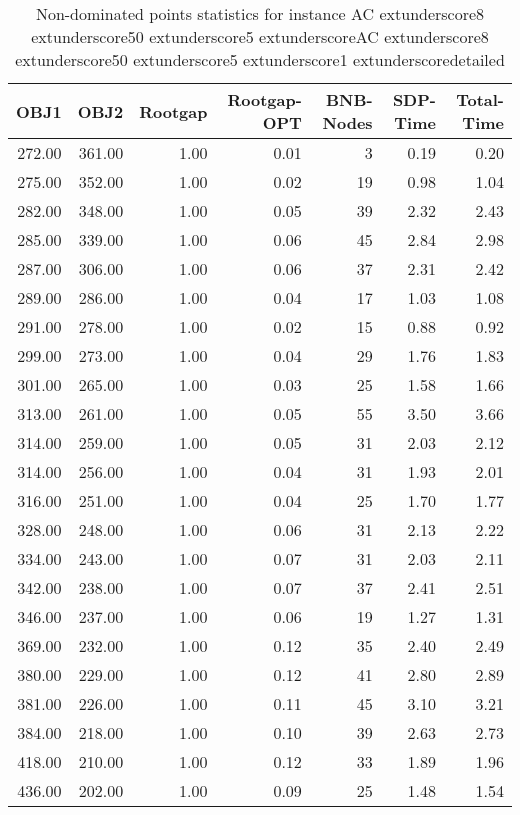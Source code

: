 \begin{table}
\caption{Non-dominated points statistics for instance AC	extunderscore8	extunderscore50	extunderscore5	extunderscoreAC	extunderscore8	extunderscore50	extunderscore5	extunderscore1	extunderscoredetailed}
\label{tab:stats/AC_8_50_5_AC_8_50_5_1_detailed}
\begin{tabular}{rrrrrrr}
\toprule
OBJ1 & OBJ2 & Rootgap & Rootgap-OPT & BNB-Nodes & SDP-Time & Total-Time \\
\midrule
272.00 & 361.00 & 1.00 & 0.01 & 3 & 0.19 & 0.20 \\
275.00 & 352.00 & 1.00 & 0.02 & 19 & 0.98 & 1.04 \\
282.00 & 348.00 & 1.00 & 0.05 & 39 & 2.32 & 2.43 \\
285.00 & 339.00 & 1.00 & 0.06 & 45 & 2.84 & 2.98 \\
287.00 & 306.00 & 1.00 & 0.06 & 37 & 2.31 & 2.42 \\
289.00 & 286.00 & 1.00 & 0.04 & 17 & 1.03 & 1.08 \\
291.00 & 278.00 & 1.00 & 0.02 & 15 & 0.88 & 0.92 \\
299.00 & 273.00 & 1.00 & 0.04 & 29 & 1.76 & 1.83 \\
301.00 & 265.00 & 1.00 & 0.03 & 25 & 1.58 & 1.66 \\
313.00 & 261.00 & 1.00 & 0.05 & 55 & 3.50 & 3.66 \\
314.00 & 259.00 & 1.00 & 0.05 & 31 & 2.03 & 2.12 \\
314.00 & 256.00 & 1.00 & 0.04 & 31 & 1.93 & 2.01 \\
316.00 & 251.00 & 1.00 & 0.04 & 25 & 1.70 & 1.77 \\
328.00 & 248.00 & 1.00 & 0.06 & 31 & 2.13 & 2.22 \\
334.00 & 243.00 & 1.00 & 0.07 & 31 & 2.03 & 2.11 \\
342.00 & 238.00 & 1.00 & 0.07 & 37 & 2.41 & 2.51 \\
346.00 & 237.00 & 1.00 & 0.06 & 19 & 1.27 & 1.31 \\
369.00 & 232.00 & 1.00 & 0.12 & 35 & 2.40 & 2.49 \\
380.00 & 229.00 & 1.00 & 0.12 & 41 & 2.80 & 2.89 \\
381.00 & 226.00 & 1.00 & 0.11 & 45 & 3.10 & 3.21 \\
384.00 & 218.00 & 1.00 & 0.10 & 39 & 2.63 & 2.73 \\
418.00 & 210.00 & 1.00 & 0.12 & 33 & 1.89 & 1.96 \\
436.00 & 202.00 & 1.00 & 0.09 & 25 & 1.48 & 1.54 \\
\bottomrule
\end{tabular}
\end{table}
